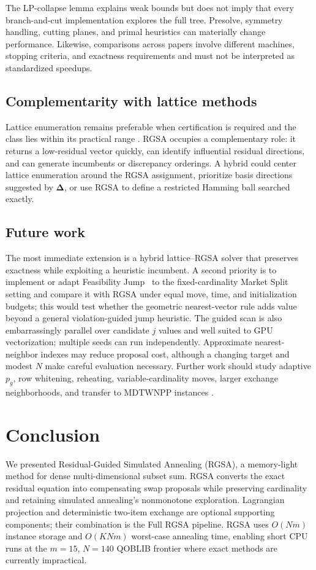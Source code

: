 \documentclass[11pt]{article}
\newcommand{\res}{\boldsymbol{\Delta}}
\begin{document}
The LP-collapse lemma explains weak bounds but does not imply that every branch-and-cut implementation explores the full tree. Presolve, symmetry handling, cutting planes, and primal heuristics can materially change performance. Likewise, comparisons across papers involve different machines, stopping criteria, and exactness requirements and must not be interpreted as standardized speedups.

\subsection{Complementarity with lattice methods}
Lattice enumeration remains preferable when certification is required and the class lies within its practical range \cite{wassermann2002,wassermann2021,wassermann2026}. RGSA occupies a complementary role: it returns a low-residual vector quickly, can identify influential residual directions, and can generate incumbents or discrepancy orderings. A hybrid could center lattice enumeration around the RGSA assignment, prioritize basis directions suggested by $\res$, or use RGSA to define a restricted Hamming ball searched exactly.

\subsection{Future work}
The most immediate extension is a hybrid lattice--RGSA solver that preserves exactness while exploiting a heuristic incumbent. A second priority is to implement or adapt Feasibility Jump~\cite{fj2023} to the fixed-cardinality Market Split setting and compare it with RGSA under equal move, time, and initialization budgets; this would test whether the geometric nearest-vector rule adds value beyond a general violation-guided jump heuristic. The guided scan is also embarrassingly parallel over candidate $j$ values and well suited to GPU vectorization; multiple seeds can run independently. Approximate nearest-neighbor indexes may reduce proposal cost, although a changing target and modest $N$ make careful evaluation necessary. Further work should study adaptive $p_g$, row whitening, reheating, variable-cardinality moves, larger exchange neighborhoods, and transfer to MDTWNPP instances \cite{kojic2010,santucci2021}.

\section{Conclusion}\label{sec:conclusion}
We presented Residual-Guided Simulated Annealing (RGSA), a memory-light method for dense multi-dimensional subset sum. RGSA converts the exact residual equation into compensating swap proposals while preserving cardinality and retaining simulated annealing's nonmonotone exploration. Lagrangian projection and deterministic two-item exchange are optional supporting components; their combination is the Full RGSA pipeline. RGSA uses $O(Nm)$ instance storage and $O(KNm)$ worst-case annealing time, enabling short CPU runs at the $m=15$, $N=140$ QOBLIB frontier where exact methods are currently impractical.
\end{document}
